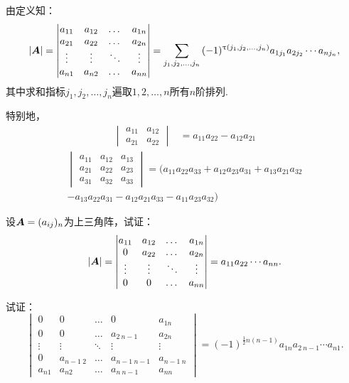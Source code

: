 \begin{theorem}
由定义知：
\begin{align}
\abs{\boldsymbol{A}}
= \begin{vmatrix}
a_{11} & a_{12} & \dots & a_{1n} \\
a_{21} & a_{22} & \dots & a_{2n} \\
\vdots & \vdots & \ddots & \vdots \\
a_{n1} & a_{n2} & \dots & a_{nn}
\end{vmatrix}
= \sum\limits_{j_1,j_2,\dotsc,j_n}{(-1)^{\uptau(j_1,j_2,\dotsc,j_n)} a_{1 j_1} a_{2 j_2} \dotsm a_{n j_n}},
\end{align}
其中求和指标\(j_1,j_2,\dotsc,j_n\)遍取\(1,2,\dotsc,n\)所有\(n\)阶排列.

特别地，%
\begin{align}
\begin{vmatrix}
a_{11} & a_{12} \\
a_{21} & a_{22}
\end{vmatrix}
&= a_{11}a_{22} - a_{12}a_{21}
\end{align}
\begin{align}
\begin{vmatrix}
a_{11} & a_{12} & a_{13} \\
a_{21} & a_{22} & a_{23} \\
a_{31} & a_{32} & a_{33}
\end{vmatrix}
= (a_{11}a_{22}a_{33} + a_{12}a_{23}a_{31} + a_{13}a_{21}a_{32} \\
- a_{13}a_{22}a_{31} - a_{12}a_{21}a_{33} - a_{11}a_{23}a_{32}) \nonumber
\end{align}
\end{theorem}


\begin{example}
设\(\boldsymbol{A}=(a_{ij})_n\)为上三角阵，试证：\[
\abs{\boldsymbol{A}}
= \begin{vmatrix}
a_{11} & a_{12} & \dots & a_{1n} \\
0 & a_{22} & \dots & a_{2n} \\
\vdots & \vdots & \ddots & \vdots \\
0 & 0 & \dots & a_{nn}
\end{vmatrix}
= a_{11} a_{22} \dotsm a_{nn}.
\]
\end{example}

\begin{example}
试证：\[
\begin{vmatrix}
0 & 0 & \dots & 0 & a_{1n} \\
0 & 0 & \dots & a_{2\ n-1} & a_{2n} \\
\vdots & \vdots & \ddots & \vdots & \vdots \\
0 & a_{n-1\ 2} & \dots & a_{n-1\ n-1} & a_{n-1\ n} \\
a_{n1} & a_{n2} & \dots & a_{n\ n-1} & a_{nn}
\end{vmatrix}
=(-1)^{\frac{1}{2}n(n-1)} a_{1n} a_{2\ n-1} \dotsm a_{n1}.
\]
\end{example}


